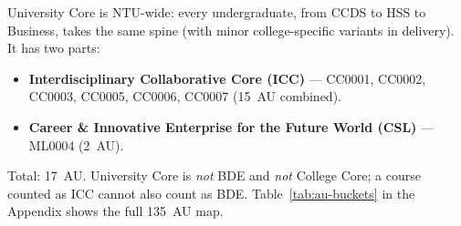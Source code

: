 \begin{definition}
University Core is NTU-wide: every undergraduate, from CCDS to HSS to Business, takes the same spine (with minor college-specific variants in delivery). It has two parts:
\begin{itemize}
    \item \textbf{Interdisciplinary Collaborative Core (ICC)} --- CC0001, CC0002, CC0003, CC0005, CC0006, CC0007 (15~AU combined).
    \item \textbf{Career \& Innovative Enterprise for the Future World (CSL)} --- ML0004 (2~AU).
\end{itemize}
Total: 17~AU. University Core is \emph{not} BDE and \emph{not} College Core; a course counted as ICC cannot also count as BDE. Table~\ref{tab:au-buckets} in the Appendix shows the full 135~AU map.
\end{definition}

